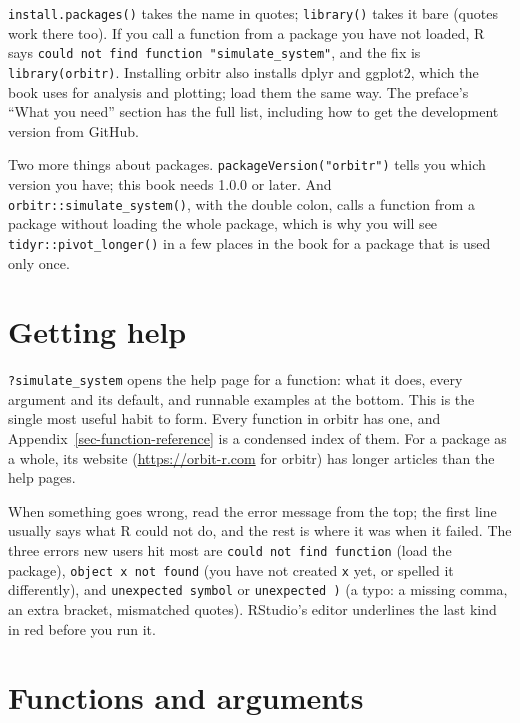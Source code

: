 \documentclass[
  10.5pt,
  letterpaper,
]{scrbook}
\theoremstyle{plain}
\theoremstyle{remark}
\begin{document}
\texttt{install.packages()} takes the name in quotes; \texttt{library()}
takes it bare (quotes work there too). If you call a function from a
package you have not loaded, R says
\texttt{could\ not\ find\ function\ "simulate\_system"}, and the fix is
\texttt{library(orbitr)}. Installing orbitr also installs dplyr and
ggplot2, which the book uses for analysis and plotting; load them the
same way. The preface's ``What you need'' section has the full list,
including how to get the development version from GitHub.

Two more things about packages. \texttt{packageVersion("orbitr")} tells
you which version you have; this book needs 1.0.0 or later. And
\texttt{orbitr::simulate\_system()}, with the double colon, calls a
function from a package without loading the whole package, which is why
you will see \texttt{tidyr::pivot\_longer()} in a few places in the book
for a package that is used only once.

\section{Getting help}\label{getting-help}

\texttt{?simulate\_system} opens the help page for a function: what it
does, every argument and its default, and runnable examples at the
bottom. This is the single most useful habit to form. Every function in
orbitr has one, and Appendix~\ref{sec-function-reference} is a condensed
index of them. For a package as a whole, its website
(\url{https://orbit-r.com} for orbitr) has longer articles than the help
pages.

When something goes wrong, read the error message from the top; the
first line usually says what R could not do, and the rest is where it
was when it failed. The three errors new users hit most are
\texttt{could\ not\ find\ function} (load the package),
\texttt{object\ \textquotesingle{}x\textquotesingle{}\ not\ found} (you
have not created \texttt{x} yet, or spelled it differently), and
\texttt{unexpected\ symbol} or
\texttt{unexpected\ \textquotesingle{})\textquotesingle{}} (a typo: a
missing comma, an extra bracket, mismatched quotes). RStudio's editor
underlines the last kind in red before you run it.

\section{Functions and arguments}\label{functions-and-arguments}
\end{document}
